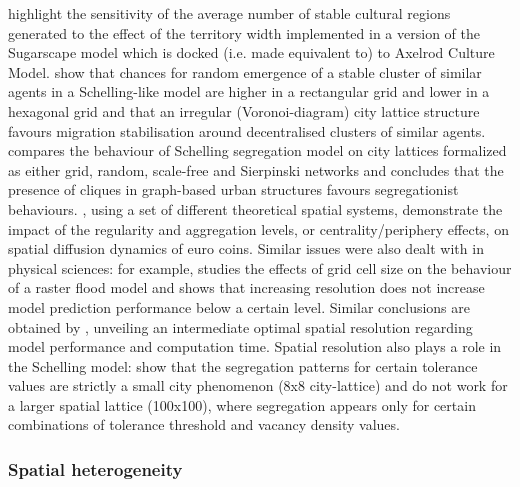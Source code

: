 \documentclass{JASSS}
\begin{document}
\citet{Axtelletal1996} highlight the sensitivity of the average number of stable cultural regions generated to the effect of the territory width implemented in a version of the Sugarscape model which is docked (i.e. made equivalent to) to Axelrod Culture Model. \citet{FlacheHegselmann2001} show that chances for random emergence of a stable cluster of similar agents in a Schelling-like model are higher in a rectangular grid and lower in a hexagonal grid and that an irregular (Voronoi-diagram) city lattice structure favours migration stabilisation around decentralised clusters of similar agents. \citet{Banos2012} compares the behaviour of Schelling segregation model on city lattices formalized as either grid, random, scale-free and Sierpinski networks and concludes that the presence of cliques in graph-based urban structures favours segregationist behaviours. \citet{LeTexierCaruso2017}, using a set of different theoretical spatial systems, demonstrate the impact of the regularity and aggregation levels, or centrality/periphery effects, on spatial diffusion dynamics of euro coins. Similar issues were also dealt with in physical sciences: for example, \cite{horritt2001effects} studies the effects of grid cell size on the behaviour of a raster flood model and shows that increasing resolution does not increase model prediction performance below a certain level. Similar conclusions are obtained by \cite{vazquez2002effect}, unveiling an intermediate optimal spatial resolution regarding model performance and computation time. Spatial resolution also plays a role in the Schelling model: \citet{Singhetal2009} show that the segregation patterns for certain tolerance values are strictly a small city phenomenon (8x8 city-lattice) and do not work for a larger spatial lattice (100x100), where segregation appears only for certain combinations of tolerance threshold and vacancy density values.

\subsubsection{Spatial heterogeneity}
\end{document}
